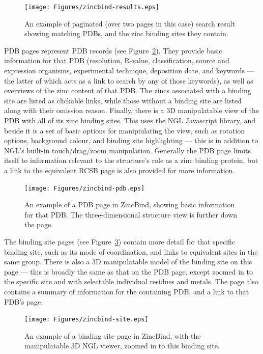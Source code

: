 \begin{figure}
\centering
\texttt{[image: Figures/zincbind-results.eps]}
\caption[An example of paginated search results.]{\label{fig:zincbind-results} An example of paginated (over two pages
in this case) search result showing matching PDBs, and the zinc binding sites
they contain.}
\end{figure}

PDB pages represent PDB records (see Figure~\ref{fig:zincbind-pdb}). They provide basic information for that PDB (resolution, R-value, classification, source and expression organisms, experimental technique, deposition date, and keywords --- the latter of which acts as a link to search by any of those keywords), as well as overviews of the zinc content of that PDB. The zincs associated with a binding site are listed as clickable links, while those without a binding site are listed along with their omission reason. Finally, there is a 3D manipulatable view of the PDB with all of its zinc binding sites. This uses the NGL Javascript library, and beside it is a set of basic options for manipiulating the view, such as rotation options, background colour, and binding site highlighting --- this is in addition to NGL's built-in touch/drag/zoom manipulation. Generally the PDB page limits itself to information relevant to the structure's role as a zinc binding protein, but a link to the equivalent RCSB page is also provided for more information.

\begin{figure}
\centering
\texttt{[image: Figures/zincbind-pdb.eps]}
\caption{\label{fig:zincbind-pdb} An example of a PDB page in ZincBind, showing basic
information for that PDB. The three-dimensional structure view is further down the page.}
\end{figure}

The binding site pages (see Figure~\ref{fig:zincbind-site}) contain more detail for that specific binding site, such as its mode of coordination, and links to equivalent sites in the same group. There is also a 3D manipulatable model of the binding site on this page --- this is broadly the same as that on the PDB page, except zoomed in to the specific site and with selectable individual residues and metals. The page also contains a summary of information for the containing PDB, and a link to that PDB's page.

\begin{figure}
\centering
\texttt{[image: Figures/zincbind-site.eps]}
\caption[An example of a binding site page in ZincBind.]{\label{fig:zincbind-site} An example of a binding site page in ZincBind, with the manipulatable
3D NGL viewer, zoomed in to this binding site.}
\end{figure}

